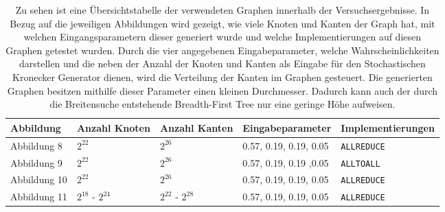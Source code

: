 \documentclass[11pt,a4paper]{article}
\begin{document}
\begin{table}[H]
	\begin{tabular}{| l | l | l | l | m{4cm} |}
	\hline
	Abbildung & Anzahl Knoten & Anzahl Kanten & Eingabeparameter & Implementierungen\\ \hline
	Abbildung 8 & \(2^{22}\) & \(2^{26}\) & 0.57, 0.19, 0.19, 0.05 & {\lstinline!ALLREDUCE!}\linebreak{\lstinline!ALLREDUCE-HYBRID!}\linebreak{\lstinline!ALLTOALL!}  \\ \hline
	Abbildung 9 & \(2^{22}\) & \(2^{26}\) & 0.57, 0.19, 0.19 ,0.05 & {\lstinline!ALLTOALL!}\linebreak{\lstinline!ALLTOALL-VARIATION!} \\ \hline
	Abbildung 10 & \(2^{22}\) & \(2^{26}\) & 0.57, 0.19, 0.19, 0.05 & {\lstinline!ALLREDUCE!}\linebreak{\lstinline!REDUCE_SCATTER!} \\ \hline
	Abbildung 11 & \(2^{18}\) - \(2^{24}\)  & \(2^{22}\) - \(2^{28}\) & 0.57, 0.19, 0.19, 0.05 & {\lstinline!ALLREDUCE!}\linebreak{\lstinline!REDUCE_SCATTER!} \\ \hline
	\end{tabular}
	\caption{Zu sehen ist eine Übersichtstabelle der verwendeten Graphen innerhalb der Versuchsergebnisse. In Bezug auf die jeweiligen Abbildungen wird gezeigt, wie viele Knoten und Kanten der Graph hat, mit welchen Eingangsparametern dieser generiert wurde und welche Implementierungen auf diesen Graphen getestet wurden. Durch die vier angegebenen Eingabeparameter, welche Wahrscheinlichkeiten darstellen und die neben der Anzahl der Knoten und Kanten als Eingabe für den Stochastischen Kronecker Generator dienen, wird die Verteilung der Kanten im Graphen gesteuert. Die generierten Graphen besitzen mithilfe dieser Parameter einen kleinen Durchmesser. Dadurch kann auch der durch die Breitensuche entstehende Breadth-First Tree nur eine geringe Höhe aufweisen.}
	\label{tab:uebersicht}
\end{table}
\end{document}
